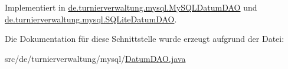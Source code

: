 Implementiert in \hyperlink{classde_1_1turnierverwaltung_1_1mysql_1_1_my_s_q_l_datum_d_a_o_a469db50145b6bb3b19aa1e9d8d9d6ed7}{de.\+turnierverwaltung.\+mysql.\+My\+S\+Q\+L\+Datum\+D\+AO} und \hyperlink{classde_1_1turnierverwaltung_1_1mysql_1_1_s_q_lite_datum_d_a_o_ab705007303b6a4d2eba08f6331e9a173}{de.\+turnierverwaltung.\+mysql.\+S\+Q\+Lite\+Datum\+D\+AO}.



Die Dokumentation für diese Schnittstelle wurde erzeugt aufgrund der Datei\+:\begin{DoxyCompactItemize}
\item 
src/de/turnierverwaltung/mysql/\hyperlink{_datum_d_a_o_8java}{Datum\+D\+A\+O.\+java}\end{DoxyCompactItemize}
